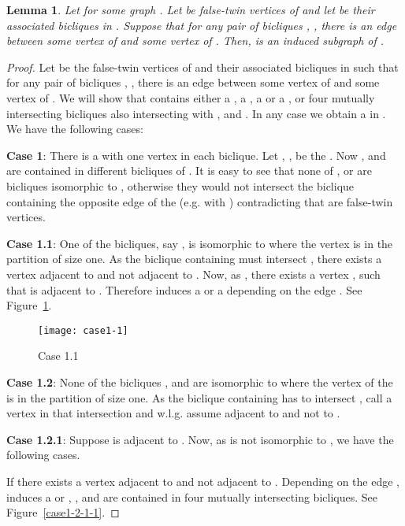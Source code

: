 \documentclass[12pt]{article}
\newtheorem{lemma}[theorem]{Lemma}
\begin{document}
\begin{lemma}\label{3gemelos}
Let  for some graph . Let  be false-twin vertices of 
and let  be their associated bicliques in . Suppose that for
any pair of bicliques , , there is an edge
between some vertex of  and some vertex of . Then,  is an induced
subgraph of .
\end{lemma}

\begin{proof}
Let  be the false-twin vertices of  and  their associated
bicliques in  such that for any pair of bicliques , , there is an edge between some vertex of  and some vertex of
. We will show that  contains either a , a , a  or a , or 
four mutually intersecting bicliques also intersecting with ,  and .
In any case we obtain a  in .
We have the following cases:

\textbf{Case 1}: There is a  with one vertex in each biclique. Let , ,  be the . Now ,  and  are contained
in  different bicliques of . It is easy to see that none of ,  or  are bicliques isomorphic to , otherwise 
they would not intersect the biclique containing the opposite edge of the  (e.g.  with ) contradicting that 
are false-twin vertices.

\textbf{Case 1.1}: One of the bicliques, say , is isomorphic to  where the vertex  is in the partition of size one.
As the biclique containing  must intersect , there exists a vertex  adjacent to
 and not adjacent to . Now, as , there exists a vertex , such that  is adjacent to .
Therefore  induces a  or a  depending on the
edge . See Figure~\ref{case1-1}.

\FloatBarrier
\begin{figure}[h]
	\centering
	\texttt{[image: case1-1]}
	\caption{Case 1.1}
	\label{case1-1}
\end{figure}
\FloatBarrier

\textbf{Case 1.2}: None of the bicliques ,  and  are isomorphic to  where the vertex of the  is in the partition of 
size one. As the biclique containing  has to intersect , 
call  a vertex in that intersection and w.l.g. assume 
adjacent to  and not to .

\textbf{Case 1.2.1}: Suppose  is adjacent to . Now, as  is not isomorphic to , we have the following cases. 

If there exists a vertex  adjacent to  and not adjacent to
.  Depending on the edge  ,    induces  a    or
,  ,   and   are  contained in
four mutually intersecting bicliques.
See Figure~\ref{case1-2-1-1}.


\end{proof}
\end{document}
